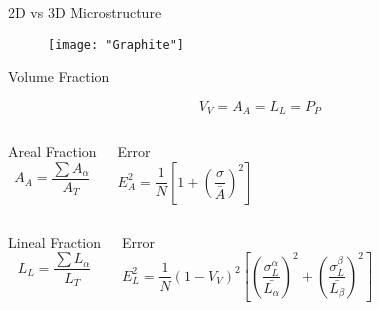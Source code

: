 \documentclass[10pt]{beamer}
\begin{document}
{%
\begin{frame}[fragile]{2D vs 3D Microstructure}

\begin{figure}[H]
\texttt{[image: "Graphite"]}

\end{figure}
    
\end{frame}
}
{%
\begin{frame}[fragile]{Volume Fraction}

\begin{equation*}
V_{V}= A_{A}= L_{L}= P_{P}
\end{equation*}


  \begin{columns}[T,onlytextwidth]
 
\begin{block}{Areal Fraction}
\begin{equation*}
A_{A} = \dfrac{\sum A_{\alpha}}{A_{T}}
\end{equation*} 
\end{block}
 

\begin{block}{Error}
\begin{equation*}
E_{A}^{2} = \dfrac{1}{N}\left[ 1+ \left( \dfrac{\sigma}{\bar{A}} \right)^{2} \right]
\end{equation*} 
\end{block}

\end{columns}

  \begin{columns}[T,onlytextwidth]
\begin{block}{Lineal Fraction}
\begin{equation*}
L_{L} = \dfrac{\sum L_{\alpha}}{L_{T}}
\end{equation*} 
\end{block}
 

\begin{block}{Error}
\small
\begin{equation*}
E_{L}^{2} = \dfrac{1}{N}(1-V_{V})^{2}\left[ \left( \dfrac{\sigma^{\alpha}_{L}}{\bar{L_{\alpha}}} \right)^{2} + \left( \dfrac{\sigma^{\beta}_{L}}{\bar{L_{\beta}}} \right)^{2} \right]
\end{equation*}


\end{block}
\end{columns}
\end{frame}}
\end{document}
